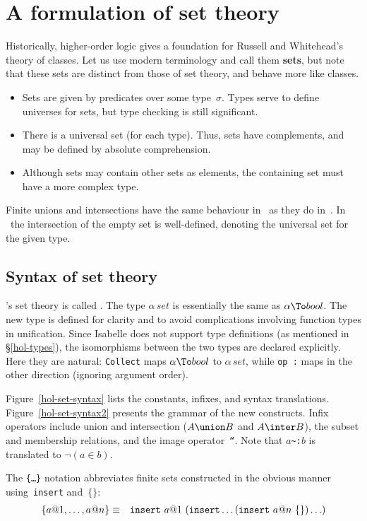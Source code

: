 \section{A formulation of set theory}
Historically, higher-order logic gives a foundation for Russell and
Whitehead's theory of classes.  Let us use modern terminology and call them
{\bf sets}, but note that these sets are distinct from those of {\ZF} set
theory, and behave more like {\ZF} classes.
\begin{itemize}
\item
Sets are given by predicates over some type~$\sigma$.  Types serve to
define universes for sets, but type checking is still significant.
\item
There is a universal set (for each type).  Thus, sets have complements, and
may be defined by absolute comprehension.
\item
Although sets may contain other sets as elements, the containing set must
have a more complex type.
\end{itemize}
Finite unions and intersections have the same behaviour in \HOL\ as they
do in~{\ZF}.  In \HOL\ the intersection of the empty set is well-defined,
denoting the universal set for the given type.

\subsection{Syntax of set theory}
\HOL's set theory is called .  The type $\alpha\,set$ is
essentially the same as $\alpha\To bool$.  The new type is defined for
clarity and to avoid complications involving function types in unification.
Since Isabelle does not support type definitions (as mentioned in
\S\ref{hol-types}), the isomorphisms between the two types are declared
explicitly.  Here they are natural: {\tt Collect} maps $\alpha\To bool$ to
$\alpha\,set$, while \hbox{\tt op :} maps in the other direction (ignoring
argument order).

Figure~\ref{hol-set-syntax} lists the constants, infixes, and syntax
translations.  Figure~\ref{hol-set-syntax2} presents the grammar of the new
constructs.  Infix operators include union and intersection ($A\union B$
and $A\inter B$), the subset and membership relations, and the image
operator~{\tt``}\@.  Note that $a$\verb|~:|$b$ is translated to
$\neg(a\in b)$.  

The {\tt\{\ldots\}} notation abbreviates finite sets constructed in the
obvious manner using~{\tt insert} and~$\{\}$:
\begin{eqnarray*}
  \{a@1, \ldots, a@n\}  & \equiv &  
  {\tt insert}~a@1~({\tt insert}\ldots({\tt insert}~a@n~\{\})\ldots)
\end{eqnarray*}

